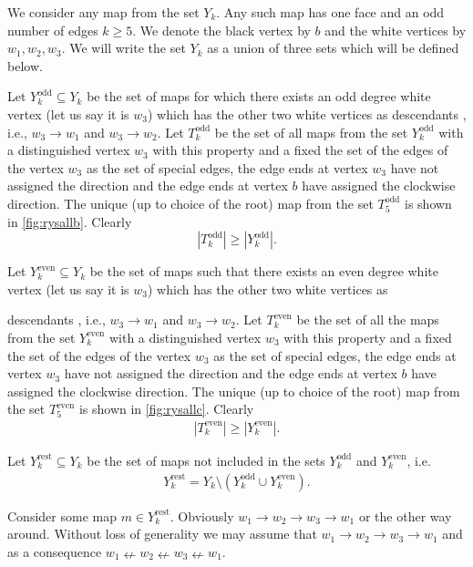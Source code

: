 \documentclass[submission]{FPSAC2021}
\DeclareMathOperator{\odd}{odd}
\DeclareMathOperator{\even}{even}
\DeclareMathOperator{\rest}{rest}
\newcommand{\successors}
{
	descendants
}
\begin{document}
We consider any map from the set $Y_k$. 
Any such map has one face and an odd 
number of edges $k \geq 5$. We denote 
the black vertex by $b$ and  the white
vertices by $w_1, w_2, w_3$. We will 
write the set $Y_k$ as a union of three 
sets which will be defined below.

Let $Y_{k}^{\odd}\subseteq Y_k$ be the 
set of maps for which there exists an
odd degree white vertex (let us say it 
is $w_3$) which has the other two white
vertices as \successors, i.e., 
$w_3\rightarrow w_1$ and 
$w_3\rightarrow w_2$. Let $T_k^{\odd}$ 
be the set of all maps from the set
$Y_k^{\odd}$ with a distinguished 
vertex $w_3$ with this property and a 
fixed the set of the edges of the 
vertex $w_3$ as the set of special edges, 
the edge ends at vertex $w_3$ have not assigned 
the direction and the edge ends at vertex 
$b$ have assigned the clockwise direction. 
The unique (up to choice of the root) 
map from the set $T_{5}^{\odd}$ is 
shown in \cref{fig:rysallb}. Clearly
\begin{equation}
\label{ineqodd}
|T_{k}^{\odd}| \geq |Y_{k}^{\odd}|.
\end{equation}

Let $Y_{k}^{\even}\subseteq Y_k$ be 
the set of maps such that there
exists an even degree white vertex 
(let us say it is $w_3$) which has 
the other two white vertices as 
\successors, i.e., 
$w_3\rightarrow w_1$ and 
$w_3\rightarrow w_2$. 
Let $T_k^{\even}$ be the set of all 
the maps from the set $Y_k^{\even}$ 
with a distinguished 
vertex $w_3$ with this property and a 
fixed the set of the edges of the 
vertex $w_3$ as the set of special edges, 
the edge ends at vertex $w_3$ have not assigned
the direction and the edge ends at vertex 
$b$ have assigned the clockwise direction. 
The unique (up to choice of 
the root) map from the set $T_{5}^{\even}$ 
is shown in \cref{fig:rysallc}. Clearly
\begin{align}
\label{ineqeven}
|T_{k}^{\even}| \geq |Y_{k}^{\even}|.
\end{align}

Let $Y_{k}^{\rest}\subseteq Y_k$ be 
the set of maps not included in the
sets $Y_{k}^{\odd}$ and 
$Y_{k}^{\even}$, i.e. 
\begin{align}
\label{yrestdef}
Y_{k}^{\rest}=Y_k 
\setminus (Y_{k}^{\odd} 
\cup Y_{k}^{\even}).
\end{align}

Consider some map $m\in Y_{k}^{\rest}$. 
Obviously $w_1 \rightarrow w_2 
\rightarrow w_3 \rightarrow w_1$ or the 
other way around. Without  loss  of  
generality  we  may  assume  that 
$w_1 \rightarrow w_2 \rightarrow w_3 
\rightarrow w_1$ and as a consequence 
$w_1 \nleftarrow w_2 \nleftarrow w_3 
\nleftarrow w_1$.
\end{document}
